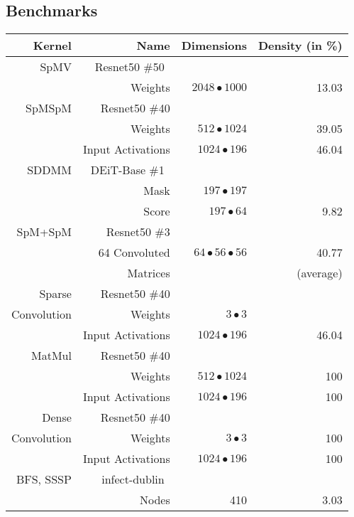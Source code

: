 \subsection{Benchmarks}
\begin{table}[h!]
    \centering
    \resizebox{0.85\columnwidth}{!} {
    \begin{tabular}{rrrr} \hline \rule{0pt}{2.5ex} 
    \textbf{Kernel}&  \textbf{Name}&  \textbf{Dimensions}& \textbf{Density (in \%)}\\ \hline
    
        
    SpMV &  Resnet50 \#50~\cite{resnet50}&  
& \\[1mm]
 & Weights& $2048 \bullet 1000 $&13.03\\ \hline \rule{0pt}{2.5ex}  
    
    SpMSpM &  Resnet50 \#40&  & \\
 & Weights& $512 \bullet 1024$&39.05\\ 
    & Input Activations& $1024 \bullet 196$&46.04
        \\[1mm]\hline \rule{0pt}{2.5ex} 


    SDDMM &  DEiT-Base \#1~\cite{deit}&  & 
            \\
 & Mask& $197 \bullet 197$&\\  
    & Score& $197 \bullet 64$&9.82
        \\[1mm] \hline \rule{0pt}{2.5ex}   

    SpM+SpM &  Resnet50 \#3&  & \\[1mm]
 & 64 Convoluted& $64 \bullet56 \bullet 56$&40.77 \\
 & Matrices & &(average)\\\hline
 Sparse& Resnet50 \#40& &\\
 Convolution& Weights& $3 \bullet 3$&\\
 & Input Activations& $1024 \bullet 196$&46.04\\\hline
 MatMul& Resnet50 \#40& &        \\
 & Weights& $512 \bullet 1024$&100\\
 & Input Activations& $1024 \bullet 196$&100\\\hline
 Dense& Resnet50 \#40& &\\
  Convolution& Weights& $3 \bullet 3$ &100\\
 & Input Activations& $1024 \bullet 196$&100\\\hline  BFS, SSSP&  infect-dublin~\cite{idublin} &  & \\
 & Nodes& 410&3.03\\[1mm]\hline
    

\end{tabular}}
\end{table}
